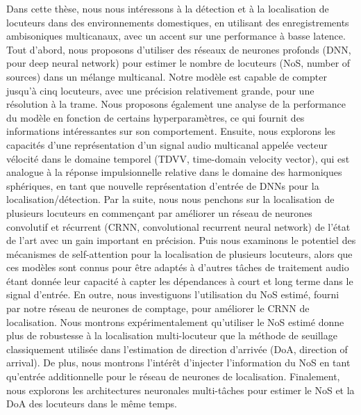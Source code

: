 \begin{resume}
Dans cette thèse, nous nous intéressons à la détection et à la localisation de locuteurs dans des environnements domestiques, en utilisant des enregistrements ambisoniques multicanaux, avec un accent sur une performance à basse latence. Tout d'abord, nous proposons d'utiliser des réseaux de neurones profonds (DNN, pour deep neural network) pour estimer le nombre de locuteurs (NoS, number of sources) dans un mélange multicanal. Notre modèle est capable de compter jusqu'à cinq locuteurs, avec une précision relativement grande, pour une résolution à la trame. Nous proposons également une analyse de la performance du modèle en fonction de certains hyperparamètres, ce qui fournit des informations intéressantes sur son comportement. Ensuite, nous explorons les capacités d'une représentation d'un signal audio multicanal appelée vecteur vélocité dans le domaine temporel (TDVV, time-domain velocity vector), qui est analogue à la réponse impulsionnelle relative dans le domaine des harmoniques sphériques, en tant que nouvelle représentation d'entrée de DNNs pour la localisation/détection. Par la suite, nous nous penchons sur la localisation de plusieurs locuteurs en commençant par améliorer un réseau de neurones convolutif et récurrent (CRNN, convolutional recurrent neural network) de l'état de l'art avec un gain important en précision. Puis nous examinons le potentiel des mécanismes de self-attention pour la localisation de plusieurs locuteurs, alors que ces modèles sont connus pour être adaptés à d'autres tâches de traitement audio étant donnée leur capacité à capter les dépendances à court et long terme dans le signal d'entrée. En outre, nous investiguons l'utilisation du NoS estimé, fourni par notre réseau de neurones de comptage, pour améliorer le CRNN de localisation. Nous montrons expérimentalement qu'utiliser le NoS estimé donne plus de robustesse à la localisation multi-locuteur que la méthode de seuillage classiquement utilisée dans l'estimation de direction d'arrivée (DoA, direction of arrival). De plus, nous montrons l'intérêt d'injecter l'information du NoS en tant qu'entrée additionnelle pour le réseau de neurones de localisation. Finalement, nous explorons les architectures neuronales multi-tâches pour estimer le NoS et la DoA des locuteurs dans le même temps.
\end{resume}